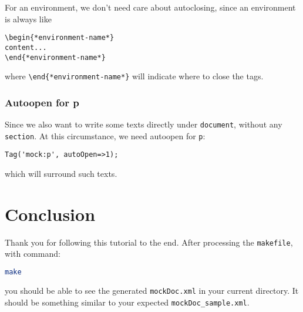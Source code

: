 \documentclass[a4paper]{article}
\begin{document}
\noindent For an environment, we don't need care about autoclosing, since an environment is always like
\begin{lstlisting}
\begin{*environment-name*}
content...
\end{*environment-name*}
\end{lstlisting}
where \texttt{\textbackslash end\{*environment-name*\}} will indicate where to close the tags.\\

\subsubsection{Autoopen for p}
Since we also want to write some texts directly under \texttt{document}, without any \texttt{section}. At this circumstance, we need autoopen for \texttt{p}:
\begin{lstlisting}
Tag('mock:p', autoOpen=>1);
\end{lstlisting}
which will surround such texts.\\

\section{Conclusion}
\noindent Thank you for following this tutorial to the end. After processing the \texttt{makefile}, with command:
\begin{lstlisting}[language=bash]
make
\end{lstlisting}
you should be able to see the generated \texttt{mockDoc.xml} in your current directory. It should be something similar to your expected \texttt{mockDoc\_sample.xml}. \\


\end{document}

